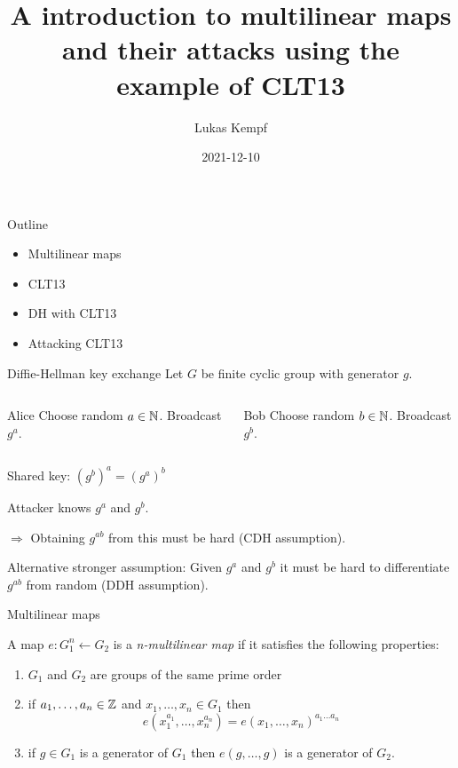 \documentclass[english]{beamer}
\title{A introduction to multilinear maps and their attacks using the example of CLT13}
\author{Lukas Kempf}
\date{2021-12-10}
\begin{document}
    \begin{frame}[plain]
        \titlepage
    \end{frame}
    \begin{frame}{Outline}
        \begin{itemize}
            \item Multilinear maps
            \item CLT13
            \item DH with CLT13
            \item Attacking CLT13
        \end{itemize}
    \end{frame}
    \begin{frame}{Diffie-Hellman key exchange}
        Let $G$ be finite cyclic group with generator $g$.

        \begin{columns}[onlytextwidth, t]
            \begin{block}{Alice}
                Choose random $a \in \mathbb{N}$. Broadcast $g^a$.
            \end{block}
            \begin{block}{Bob}
                Choose random $b \in \mathbb{N}$. Broadcast $g^b$.
            \end{block}
        \end{columns}

        Shared key: $(g^b)^a = (g^a)^b$

        \pause\vspace{0.6cm}
        Attacker knows $g^a$ and $g^b$.

        $\Rightarrow$ Obtaining $g^{ab}$ from this must be hard (CDH assumption).

        \pause
        Alternative stronger assumption: Given $g^a$ and $g^b$ it must be hard to differentiate $g^{ab}$ from random (DDH assumption).
    \end{frame}
    \begin{frame}{Multilinear maps}
        \begin{definition}
            A map $e: G_1^n \leftarrow G_2$ is a \emph{n-multilinear map} if it satisfies the following properties:
            \begin{enumerate}
                \item $G_1$ and $G_2$ are groups of the same prime order
                \item if $a_1,\dots ,a_n \in \mathbb{Z}$ and $x_1, \dots, x_n \in G_1$ then
                    \begin{equation*}
                        e\left( x_1^{a_1}, \dots, x_n^{a_n} \right) = e(x_1, \dots, x_n)^{a_1\dots a_n}
                    \end{equation*}
                \item if $g \in G_1$ is a generator of $G_1$ then $e(g, \dots, g)$ is a generator of $G_2$.
            \end{enumerate}
        \end{definition}
    \end{frame}
\end{document}

